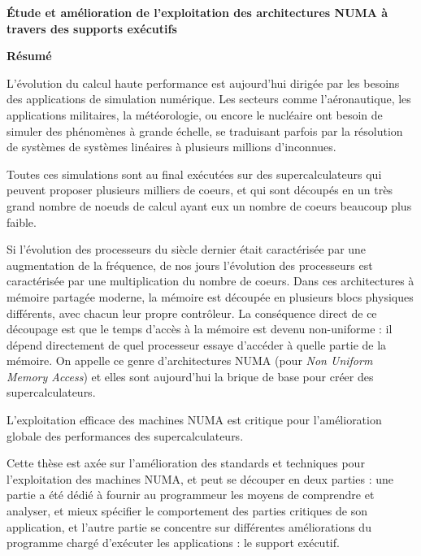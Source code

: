 \MakeUGthesePDG

\clearpage
\ifodd\value{page}\hbox{}\newpage\fi

\begin{center}\textbf{\large Étude et amélioration de l'exploitation des architectures NUMA à travers des supports exécutifs}

\quad

\textbf{Résumé}
\end{center}

L'évolution du calcul haute performance est aujourd'hui dirigée par les besoins des applications de simulation numérique.
Les secteurs comme l'aéronautique, les applications militaires, la météorologie, ou encore le nucléaire ont besoin de simuler des phénomènes à grande échelle, se traduisant parfois par la résolution de systèmes de systèmes linéaires à plusieurs millions d'inconnues.

Toutes ces simulations sont au final exécutées sur des supercalculateurs qui peuvent proposer plusieurs milliers de coeurs, et qui sont découpés en un très grand nombre de noeuds de calcul ayant eux un nombre de coeurs beaucoup plus faible.

Si l'évolution des processeurs du siècle dernier était caractérisée par une augmentation de la fréquence, de nos jours l'évolution des processeurs est caractérisée par une multiplication du nombre de coeurs.
Dans ces architectures à mémoire partagée moderne, la mémoire est découpée en plusieurs blocs physiques différents, avec chacun leur propre contrôleur.
La conséquence direct de ce découpage est que le temps d'accès à la mémoire est devenu non-uniforme : il dépend directement de quel processeur essaye d'accéder à quelle partie de la mémoire.
On appelle ce genre d'architectures NUMA (pour \emph{Non Uniform Memory Access}) et elles sont aujourd'hui la brique de base pour créer des supercalculateurs.

L'exploitation efficace des machines NUMA est critique pour l'amélioration globale des performances des supercalculateurs.

Cette thèse est axée sur l'amélioration des standards et techniques pour l'exploitation des machines NUMA, et peut se découper en deux parties : une partie a été dédié à fournir au programmeur les moyens de comprendre et analyser, et mieux spécifier le comportement des parties critiques de son application, et l'autre partie se concentre sur différentes améliorations du programme chargé d'exécuter les applications : le support exécutif.



